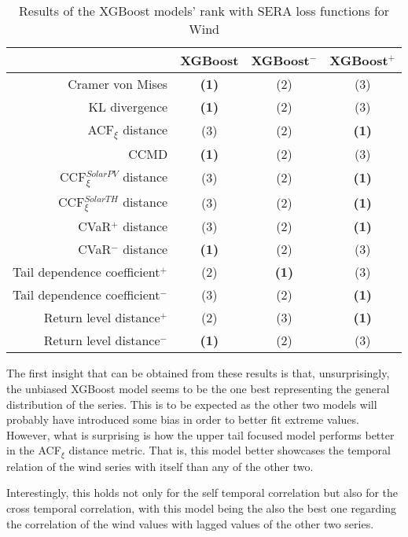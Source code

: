 \begin{table}[ht]
    \centering
    \footnotesize
    \begin{tabular}[r]{r|c|cc}
        \toprule
        &XGBoost&XGBoost$^-$&XGBoost$^+$ \\
        \midrule            
        Cramer von Mises&\textbf{(1)}&(2)&(3) \\
        KL divergence&\textbf{(1)}&(2)&(3) \\
        ACF$_\xi$ distance&(3)&(2)&\textbf{(1)} \\
        \midrule
        CCMD&\textbf{(1)}&(2)&(3) \\
        CCF$_\xi^{Solar PV}$ distance&(3)&(2)&\textbf{(1)} \\
        CCF$_\xi^{Solar TH}$ distance&(3)&(2)&\textbf{(1)} \\
        \midrule
        CVaR$^+$ distance&(3)&(2)&\textbf{(1)} \\
        CVaR$^-$ distance&\textbf{(1)}&(2)&(3) \\
        Tail dependence coefficient$^+$&(2)&\textbf{(1)}&(3) \\
        Tail dependence coefficient$^-$&(3)&(2)&\textbf{(1)} \\
        Return level distance$^+$&(2)&(3)&\textbf{(1)} \\
        Return level distance$^-$&\textbf{(1)}&(2)&(3) \\
        \bottomrule
    \end{tabular}
    \caption{Results of the XGBoost models' rank with SERA loss functions for Wind\label{long}}
    \label{table:results-custom-loss}
\end{table}

The first insight that can be obtained from these results is that, unsurprisingly, the unbiased XGBoost model seems to be the one best representing the general distribution of the series. This is to be expected as the other two models will probably have introduced some bias in order to better fit extreme values. However, what is surprising is how the upper tail focused model performs better in the ACF$_\xi$ distance metric. That is, this model better showcases the temporal relation of the wind series with itself than any of the other two. 

Interestingly, this holds not only for the self temporal correlation but also for the cross temporal correlation, with this model being the also the best one regarding the correlation of the wind values with lagged values of the other two series. 

